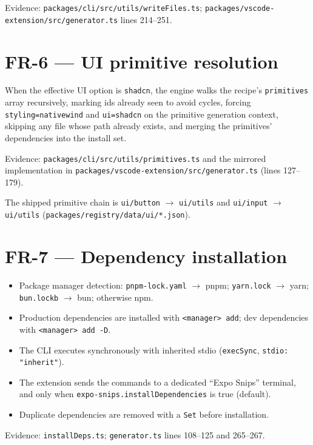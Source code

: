Evidence: \texttt{packages/cli/src/utils/writeFiles.ts};
\texttt{packages/vscode-extension/src/generator.ts} lines 214--251.

\section{FR-6 --- UI primitive resolution}

When the effective UI option is \texttt{shadcn}, the engine walks the recipe's
\texttt{primitives} array recursively, marking ids already seen to avoid cycles,
forcing \texttt{styling=nativewind} and \texttt{ui=shadcn} on the primitive
generation context, skipping any file whose path already exists, and merging the
primitives' dependencies into the install set.

Evidence: \texttt{packages/cli/src/utils/primitives.ts} and the mirrored
implementation in \texttt{packages/vscode-extension/src/generator.ts}
(lines 127--179).

The shipped primitive chain is \texttt{ui/button} $\rightarrow$ \texttt{ui/utils}
and \texttt{ui/input} $\rightarrow$ \texttt{ui/utils}
(\texttt{packages/registry/data/ui/*.json}).

\section{FR-7 --- Dependency installation}

\begin{itemize}
  \item Package manager detection: \texttt{pnpm-lock.yaml} $\rightarrow$ pnpm;
        \texttt{yarn.lock} $\rightarrow$ yarn; \texttt{bun.lockb} $\rightarrow$ bun;
        otherwise npm.
  \item Production dependencies are installed with \texttt{<manager> add}; dev
        dependencies with \texttt{<manager> add -D}.
  \item The CLI executes synchronously with inherited stdio
        (\texttt{execSync}, \texttt{stdio: "inherit"}).
  \item The extension sends the commands to a dedicated ``Expo Snips'' terminal,
        and only when \texttt{expo-snips.installDependencies} is true (default).
  \item Duplicate dependencies are removed with a \texttt{Set} before installation.
\end{itemize}

Evidence: \texttt{installDeps.ts}; \texttt{generator.ts} lines 108--125 and
265--267.


